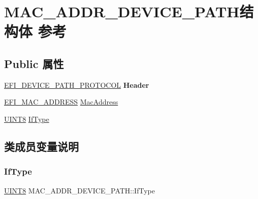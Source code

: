 \hypertarget{struct_m_a_c___a_d_d_r___d_e_v_i_c_e___p_a_t_h}{}\section{M\+A\+C\+\_\+\+A\+D\+D\+R\+\_\+\+D\+E\+V\+I\+C\+E\+\_\+\+P\+A\+T\+H结构体 参考}
\label{struct_m_a_c___a_d_d_r___d_e_v_i_c_e___p_a_t_h}
\subsection*{Public 属性}
\begin{DoxyCompactItemize}
\item 
\mbox{\label{struct_m_a_c___a_d_d_r___d_e_v_i_c_e___p_a_t_h_aa5261bec82b659833203ce3936af4bf9}} 
\hyperlink{struct_e_f_i___d_e_v_i_c_e___p_a_t_h___p_r_o_t_o_c_o_l}{E\+F\+I\+\_\+\+D\+E\+V\+I\+C\+E\+\_\+\+P\+A\+T\+H\+\_\+\+P\+R\+O\+T\+O\+C\+OL} {\bfseries Header}
\item 
\hyperlink{struct_e_f_i___m_a_c___a_d_d_r_e_s_s}{E\+F\+I\+\_\+\+M\+A\+C\+\_\+\+A\+D\+D\+R\+E\+SS} \hyperlink{struct_m_a_c___a_d_d_r___d_e_v_i_c_e___p_a_t_h_a6d73c7e77507b491059deafaed8522b6}{Mac\+Address}
\item 
\hyperlink{_processor_bind_8h_ab27e9918b538ce9d8ca692479b375b6a}{U\+I\+N\+T8} \hyperlink{struct_m_a_c___a_d_d_r___d_e_v_i_c_e___p_a_t_h_af38cb9709ed3da6ac77dd0e48cc3e81d}{If\+Type}
\end{DoxyCompactItemize}


\subsection{类成员变量说明}
\mbox{\label{struct_m_a_c___a_d_d_r___d_e_v_i_c_e___p_a_t_h_af38cb9709ed3da6ac77dd0e48cc3e81d}} 
\subsubsection{\texorpdfstring{If\+Type}{IfType}}
{\footnotesize\ttfamily \hyperlink{_processor_bind_8h_ab27e9918b538ce9d8ca692479b375b6a}{U\+I\+N\+T8} M\+A\+C\+\_\+\+A\+D\+D\+R\+\_\+\+D\+E\+V\+I\+C\+E\+\_\+\+P\+A\+T\+H\+::\+If\+Type}


